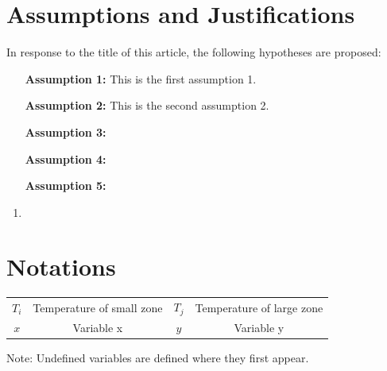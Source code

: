 \newpage%
\section{Assumptions and Justifications}
In response to the title of this article, the following hypotheses are proposed:

\begin{enumerate}[
	label = (\arabic*),
	itemindent = 0pt,
	labelindent = \parindent,
	labelwidth = 2em,
	labelsep = 5pt,
	leftmargin = 8em]
	\item[\textbf{Assumption 1:}] This is the first assumption 1.
	\item[\textbf{Assumption 2:}] This is the second assumption 2.
	\item[\textbf{Assumption 3:}] 
	\item[\textbf{Assumption 4:}] 
	\item[\textbf{Assumption 5:}] 
\end{enumerate}


\begin{enumerate}
	\item 
\end{enumerate}



\section{Notations}
\begin{center}
	\begin{tabular}{cccc}
		\toprule[1pt] 
		\makebox[0.15\textwidth][c]{Symbol} & \makebox[0.3\textwidth][c]{Description} & \makebox[0.15\textwidth][c]{Symbol} & \makebox[0.3\textwidth][c]{Description} \\  
		\hline
		$T_i$ & Temperature of small zone & $T_j$ & Temperature of large zone \\
		$x$ & Variable x & $y$ & Variable y \\    
		\bottomrule[1pt]
	\end{tabular}
	\par \vspace{0.5em} \noindent Note: Undefined variables are defined where they first appear.
\end{center}


